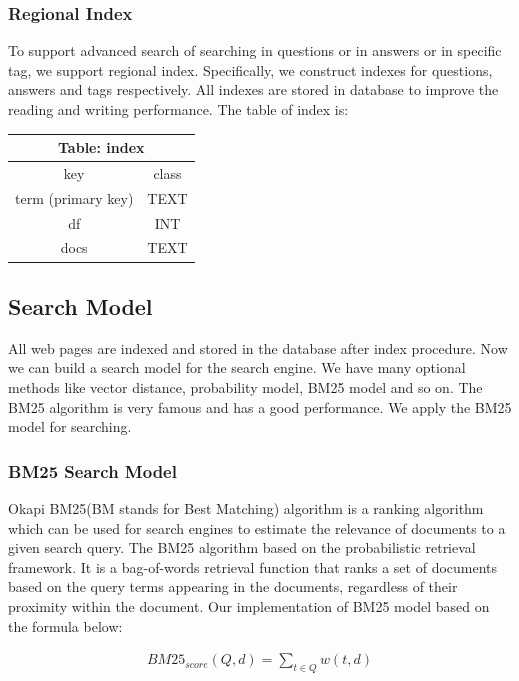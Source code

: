 \documentclass[10pt,journal,compsoc]{IEEEtran}
\begin{document}
\subsubsection{Regional Index}
To support advanced search of searching in questions or in answers or in specific tag, we support regional index. Specifically, we construct indexes for questions, answers and tags respectively. All indexes are stored in database to improve the reading and writing performance. The table of index is:
\begin{table}[H]
\centering
\begin{tabular}{cc}
\toprule
\multicolumn{2}{c}{\textbf{Table: index}} \\
\midrule
key                   & class             \\
\midrule
term (primary key)                    & TEXT               \\
df                   & INT               \\
docs                  & TEXT              \\
\bottomrule
\end{tabular}
\end{table}


\subsection{Search Model}
\label{subsec:search_engine}
All web pages are indexed and stored in the database after index procedure. Now we can build a search model for the search engine. We have many optional methods like vector distance, probability model, BM25 model and so on. The BM25\cite{robertson2009probabilistic} algorithm is very famous and has a good performance. We apply the BM25 model for searching.

\subsubsection{BM25 Search Model}
Okapi BM25(BM stands for Best Matching) algorithm is a ranking algorithm which can be used for search engines to estimate the relevance of documents to a given search query. The BM25 algorithm based on the probabilistic retrieval framework. It is a bag-of-words retrieval function that ranks a set of documents based on the query terms appearing in the documents, regardless of their proximity within the document. Our implementation of BM25 model based on the formula below:

\begin{equation*}
\begin{aligned}
BM25_{score}(Q, d) = \sum_{t\in Q}w(t,d)
\end{aligned}
\end{equation*}
\end{document}
